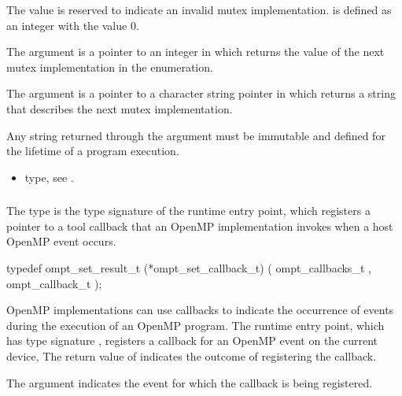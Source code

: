 The value  is reserved to indicate an invalid 
mutex implementation.  is defined as an integer 
with the value 0.

The  argument is a pointer to an integer in which 
 returns the value of the next mutex 
implementation in the enumeration.

The  argument is a pointer to a character string pointer
in which  returns a string that describes
the next mutex implementation.

\constraints
Any string returned through the  argument must be 
immutable and defined for the lifetime of a program execution.

\crossreferences
\begin{itemize}
\item {} type, see .
\end{itemize}



\subsubsection{}
\label{sec:ompt_set_callback_t}
\label{sec:ompt_set_callback}

\summary
The  type is the type signature of the 
 runtime entry point, which registers a
pointer to a tool callback that an OpenMP implementation invokes 
when a host OpenMP event occurs.

\format
\begin{ccppspecific}
\begin{omptCallback}
typedef ompt_set_result_t (*ompt_set_callback_t) (
  ompt_callbacks_t ,
  ompt_callback_t 
);
\end{omptCallback}
\end{ccppspecific}

\descr
OpenMP implementations can use callbacks to indicate the occurrence of events 
during the execution of an OpenMP program. The  runtime
entry point, which has type signature , registers a 
callback for an OpenMP event on the current device, The return value of 
 indicates the outcome of registering the callback.

\argdesc
The  argument indicates the event for which the callback is 
being registered.

